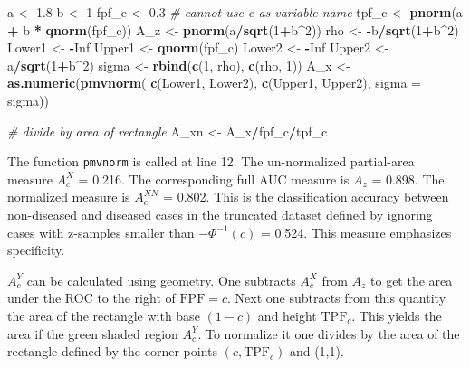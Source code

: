 \documentclass[
]{book}
\newenvironment{Shaded}{\begin{snugshade}}{\end{snugshade}}
\newcommand{\CommentTok}[1]{\textcolor[rgb]{0.56,0.35,0.01}{\textit{#1}}}
\newcommand{\DataTypeTok}[1]{\textcolor[rgb]{0.13,0.29,0.53}{#1}}
\newcommand{\DecValTok}[1]{\textcolor[rgb]{0.00,0.00,0.81}{#1}}
\newcommand{\FloatTok}[1]{\textcolor[rgb]{0.00,0.00,0.81}{#1}}
\newcommand{\KeywordTok}[1]{\textcolor[rgb]{0.13,0.29,0.53}{\textbf{#1}}}
\newcommand{\NormalTok}[1]{#1}
\newcommand{\OperatorTok}[1]{\textcolor[rgb]{0.81,0.36,0.00}{\textbf{#1}}}
\newcommand{\OtherTok}[1]{\textcolor[rgb]{0.56,0.35,0.01}{#1}}
\newcommand{\StringTok}[1]{\textcolor[rgb]{0.31,0.60,0.02}{#1}}
\begin{document}
\begin{Shaded}
\begin{Highlighting}[numbers=left,,]
\NormalTok{a <-}\StringTok{ }\FloatTok{1.8}
\NormalTok{b <-}\StringTok{ }\DecValTok{1}
\NormalTok{fpf_c <-}\StringTok{ }\FloatTok{0.3} \CommentTok{# cannot use c as variable name}
\NormalTok{tpf_c <-}\StringTok{ }\KeywordTok{pnorm}\NormalTok{(a }\OperatorTok{+}\StringTok{ }\NormalTok{b }\OperatorTok{*}\StringTok{ }\KeywordTok{qnorm}\NormalTok{(fpf_c))}
\NormalTok{A_z <-}\StringTok{ }\KeywordTok{pnorm}\NormalTok{(a}\OperatorTok{/}\KeywordTok{sqrt}\NormalTok{(}\DecValTok{1}\OperatorTok{+}\NormalTok{b}\OperatorTok{^}\DecValTok{2}\NormalTok{))}
\NormalTok{rho <-}\StringTok{ }\OperatorTok{-}\NormalTok{b}\OperatorTok{/}\KeywordTok{sqrt}\NormalTok{(}\DecValTok{1}\OperatorTok{+}\NormalTok{b}\OperatorTok{^}\DecValTok{2}\NormalTok{)}
\NormalTok{Lower1 <-}\StringTok{ }\OperatorTok{-}\OtherTok{Inf}
\NormalTok{Upper1 <-}\StringTok{ }\KeywordTok{qnorm}\NormalTok{(fpf_c)}
\NormalTok{Lower2 <-}\StringTok{ }\OperatorTok{-}\OtherTok{Inf}
\NormalTok{Upper2 <-}\StringTok{ }\NormalTok{a}\OperatorTok{/}\KeywordTok{sqrt}\NormalTok{(}\DecValTok{1}\OperatorTok{+}\NormalTok{b}\OperatorTok{^}\DecValTok{2}\NormalTok{)}
\NormalTok{sigma <-}\StringTok{ }\KeywordTok{rbind}\NormalTok{(}\KeywordTok{c}\NormalTok{(}\DecValTok{1}\NormalTok{, rho), }\KeywordTok{c}\NormalTok{(rho, }\DecValTok{1}\NormalTok{))}
\NormalTok{A_x <-}\StringTok{ }\KeywordTok{as.numeric}\NormalTok{(}\KeywordTok{pmvnorm}\NormalTok{(}
  \KeywordTok{c}\NormalTok{(Lower1, Lower2), }
  \KeywordTok{c}\NormalTok{(Upper1, Upper2), }
  \DataTypeTok{sigma =}\NormalTok{ sigma))}

\CommentTok{# divide by area of rectangle}
\NormalTok{A_xn <-}\StringTok{ }\NormalTok{A_x}\OperatorTok{/}\NormalTok{fpf_c}\OperatorTok{/}\NormalTok{tpf_c}
\end{Highlighting}
\end{Shaded}

The function \texttt{pmvnorm} is called at line 12. The un-normalized partial-area measure \(A_c^{X}\) = 0.216. The corresponding full AUC measure is \(A_z\) = 0.898. The normalized measure is \(A_c^{XN}\) = 0.802. This is the classification accuracy between non-diseased and diseased cases in the truncated dataset defined by ignoring cases with z-samples smaller than \(-\Phi^{-1}(c)\) = 0.524. This measure emphasizes specificity.

\(A_c^{Y}\) can be calculated using geometry. One subtracts \(A_c^{X}\) from \(A_z\) to get the area under the ROC to the right of \(\text{FPF}=c\). Next one subtracts from this quantity the area of the rectangle with base \((1 - c)\) and height \(\text{TPF}_c\). This yields the area if the green shaded region \(A_c^{Y}\). To normalize it one divides by the area of the rectangle defined by the corner points \((c,\text{TPF}_c)\) and (1,1).
\end{document}
